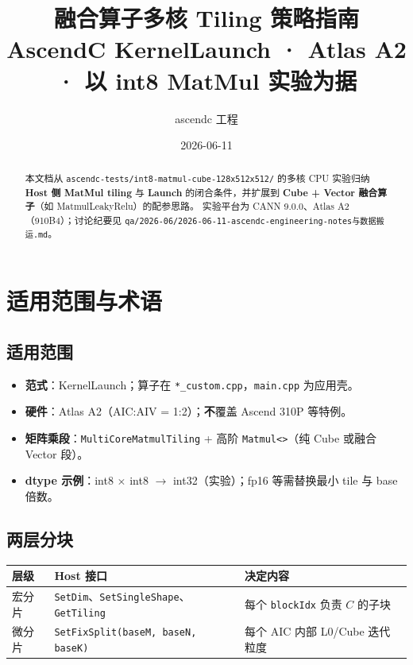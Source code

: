 \documentclass[UTF8,a4paper,11pt]{ctexart}
\title{融合算子多核 Tiling 策略指南\\{\large AscendC KernelLaunch · Atlas A2 · 以 int8 MatMul 实验为据}}
\author{ascendc 工程}
\date{2026-06-11}
\begin{document}
\maketitle

\begin{abstract}
本文档从 \texttt{ascendc-tests/int8-matmul-cube-128x512x512/} 的多核 CPU 实验归纳
\textbf{Host 侧 MatMul tiling} 与 \textbf{Launch} 的闭合条件，并扩展到
\textbf{Cube + Vector 融合算子}（如 MatmulLeakyRelu）的配参思路。
实验平台为 CANN 9.0.0、Atlas A2（910B4）；讨论纪要见
\texttt{qa/2026-06/2026-06-11-ascendc-engineering-notes与数据搬运.md}。
\end{abstract}

\tableofcontents
\newpage

\section{适用范围与术语}

\subsection{适用范围}
\begin{itemize}
  \item \textbf{范式}：KernelLaunch；算子在 \texttt{*\_custom.cpp}，\texttt{main.cpp} 为应用壳。
  \item \textbf{硬件}：Atlas A2（AIC:AIV = 1:2）；\textbf{不}覆盖 Ascend 310P 等特例。
  \item \textbf{矩阵乘段}：\texttt{MultiCoreMatmulTiling} + 高阶 \texttt{Matmul<>}（纯 Cube 或融合 Vector 段）。
  \item \textbf{dtype 示例}：int8 $\times$ int8 $\rightarrow$ int32（实验）；fp16 等需替换最小 tile 与 base 倍数。
\end{itemize}

\subsection{两层分块}
\begin{table}[h]
  \centering
  \begin{tabular}{lll}
    \toprule
    层级 & Host 接口 & 决定内容 \\
    \midrule
    宏分片 & \texttt{SetDim}、\texttt{SetSingleShape}、\texttt{GetTiling} & 每个 \texttt{blockIdx} 负责 $C$ 的子块 \\
    微分片 & \texttt{SetFixSplit(baseM, baseN, baseK)} & 每个 AIC 内部 L0/Cube 迭代粒度 \\
  \end{tabular}
\end{table}
\end{document}

